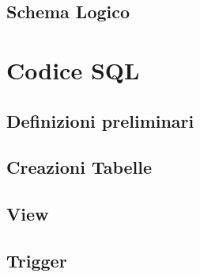 \documentclass[a4paper,12pt,oneside]{book}
\begin{document}
    \section{Schema Logico}
    \chapter{Codice SQL}
    \section{Definizioni preliminari}
    \section{Creazioni Tabelle}
    \section{View}
    \section{Trigger}
\end{document}
